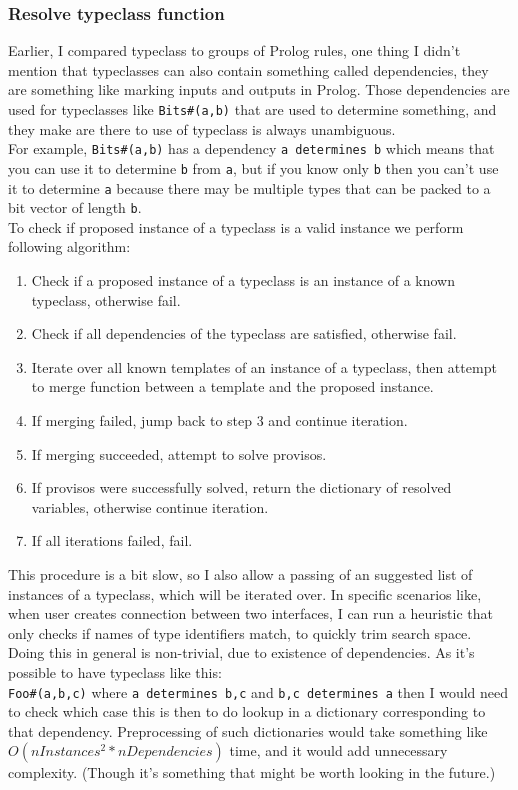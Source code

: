 \documentclass[14pt]{report}
\begin{document}
\subsubsection*{Resolve typeclass function}
Earlier, I compared typeclass to groups of Prolog rules, one thing I didn't mention that typeclasses can also contain something called dependencies, they are something like marking inputs and outputs in Prolog. Those dependencies are used for typeclasses like \verb!Bits#(a,b)! that are used to determine something, and they make are there to use of typeclass is always unambiguous. \\
For example, \verb!Bits#(a,b)! has a dependency \verb!a determines b! which means that you can use it to determine \verb!b! from \verb!a!, but if you know only \verb!b! then you can't use it to determine \verb!a! because there may be multiple types that can be packed to a bit vector of length \verb!b!. 
\\  
To check if proposed instance of a typeclass is a valid instance we perform following algorithm:
\begin{enumerate}
    \item Check if a proposed instance of a typeclass is an instance of a known typeclass, otherwise fail.
    \item Check if all dependencies of the typeclass are satisfied, otherwise fail.
    \item Iterate over all known templates of an instance of a typeclass, then attempt to merge function between a template and the proposed instance. 
    \item If merging failed, jump back to step 3 and continue iteration.
    \item If merging succeeded, attempt to solve provisos.
    \item If provisos were successfully solved, return the dictionary of resolved variables, otherwise continue iteration.
    \item If all iterations failed, fail.
\end{enumerate}
This procedure is a bit slow, so I also allow a passing of an suggested list of instances of a typeclass, which will be iterated over. In specific scenarios like, when user creates connection between two interfaces, I can run a heuristic that only checks if names of type identifiers match, to quickly trim search space. Doing this in general is non-trivial, due to existence of dependencies. As it's possible to have typeclass like this:
\\
\verb!Foo#(a,b,c)! where \verb!a determines b,c! and \verb!b,c determines a! then I would need to check which case this is then to do lookup in a dictionary corresponding to that dependency. Preprocessing of such dictionaries would take something like $O(nInstances^2*nDependencies)$ time, and it would add unnecessary complexity. (Though it's something that might be worth looking in the future.)
\end{document}
